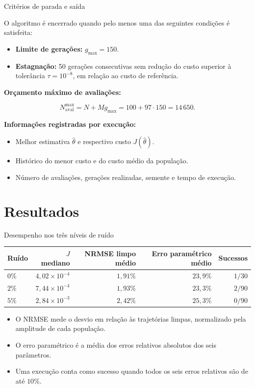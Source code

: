 \begin{frame}{Critérios de parada e saída}

  O algoritmo é encerrado quando pelo menos uma das
  seguintes condições é satisfeita:

  \begin{itemize}
    \item \textbf{Limite de gerações:} $g_{\max}=150$.
    \item \textbf{Estagnação:} 50 gerações consecutivas sem
          redução do custo superior à tolerância
          $\tau=10^{-8}$, em relação ao custo de referência.
  \end{itemize}

  \textbf{Orçamento máximo de avaliações:}

  \[
    N_{\mathrm{aval}}^{\max}
    =N+Mg_{\max}
    =100+97\cdot150
    =14\,650.
  \]

  \textbf{Informações registradas por execução:}

  \begin{itemize}
    \item Melhor estimativa $\hat{\theta}$ e respectivo custo
          $J(\hat{\theta})$.
    \item Histórico do menor custo e do custo médio da população.
    \item Número de avaliações, gerações realizadas,
          semente e tempo de execução.
  \end{itemize}

\end{frame}

\section{Resultados}

\begin{frame}{Desempenho nos três níveis de ruído}
  \centering
  \begin{tabular}{lrrrr}
    \toprule
    Ruído & $J$ mediano & NRMSE limpo médio & Erro paramétrico médio & Sucessos \\
    \midrule
    $0\%$ & $4{,}02\times 10^{-4}$ & $1{,}91\%$ & $23{,}9\%$ & $1/30$ \\
    $2\%$ & $7{,}44\times 10^{-4}$ & $1{,}93\%$ & $23{,}3\%$ & $2/90$ \\
    $5\%$ & $2{,}84\times 10^{-3}$ & $2{,}42\%$ & $25{,}3\%$ & $0/90$ \\
    \bottomrule
  \end{tabular}

  \medskip
  \begin{itemize}
    \item O NRMSE mede o desvio em relação às trajetórias limpas,
          normalizado pela amplitude de cada população.
    \item O erro paramétrico é a média dos erros relativos absolutos
          dos seis parâmetros.
    \item Uma execução conta como sucesso quando todos os seis erros
          relativos são de até $10\%$.
  \end{itemize}
\end{frame}

